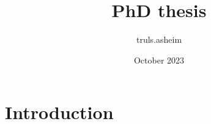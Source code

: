 \documentclass{article}
\title{PhD thesis}
\author{truls.asheim }
\date{October 2023}
\begin{document}
\maketitle

\section{Introduction}
\end{document}
